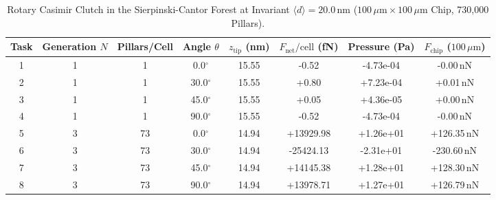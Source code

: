 \begin{table}[t]
\centering
\caption{Rotary Casimir Clutch in the Sierpinski-Cantor Forest at Invariant $\langle d \rangle = 20.0\,\text{nm}$ ($100\,\mu\text{m} \times 100\,\mu\text{m}$ Chip, 730,000 Pillars).}
\label{tab:cantor_forest_clutch}
\begin{tabular}{cccccccc}
\hline\hline
Task & Generation $N$ & Pillars/Cell & Angle $\theta$ & $z_{\text{tip}}$ (nm) & $F_{\text{net}}/\text{cell}$ (fN) & Pressure (Pa) & $F_{\text{chip}}$ ($100\,\mu\text{m}$) \\
\hline
1 & 1 & 1 & 0.0$^\circ$ & 15.55 & -0.52 & -4.73e-04 & -0.00\,nN \\
2 & 1 & 1 & 30.0$^\circ$ & 15.55 & +0.80 & +7.23e-04 & +0.01\,nN \\
3 & 1 & 1 & 45.0$^\circ$ & 15.55 & +0.05 & +4.36e-05 & +0.00\,nN \\
4 & 1 & 1 & 90.0$^\circ$ & 15.55 & -0.52 & -4.73e-04 & -0.00\,nN \\
5 & 3 & 73 & 0.0$^\circ$ & 14.94 & +13929.98 & +1.26e+01 & +126.35\,nN \\
6 & 3 & 73 & 30.0$^\circ$ & 14.94 & -25424.13 & -2.31e+01 & -230.60\,nN \\
7 & 3 & 73 & 45.0$^\circ$ & 14.94 & +14145.38 & +1.28e+01 & +128.30\,nN \\
8 & 3 & 73 & 90.0$^\circ$ & 14.94 & +13978.71 & +1.27e+01 & +126.79\,nN \\
\hline\hline
\end{tabular}
\end{table}

